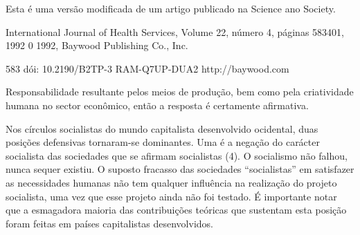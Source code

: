 \documentclass[twocolumn,amsmath,amssymb,aps,pre,floatfix]{revtex4-2}
\begin{document}
\par
Esta é uma versão modificada de um artigo publicado na Science ano Society.
\par
International Journal of Health Services, Volume 22, número 4, páginas 583401, 1992 0 1992, Baywood Publishing Co., Inc.
\par
583 dói: 10.2190/B2TP-3 RAM-Q7UP-DUA2 http://baywood.com
\par
Responsabilidade resultante pelos meios de produção, bem como pela criatividade humana no sector econômico, então a resposta é certamente afirmativa.
\par
Nos círculos socialistas do mundo capitalista desenvolvido ocidental, duas posições defensivas tornaram-se dominantes. Uma é a negação do carácter socialista das sociedades que se afirmam socialistas (4). O socialismo não falhou, nunca sequer existiu. O suposto fracasso das sociedades “socialistas” em satisfazer as necessidades humanas não tem qualquer influência na realização do projeto socialista, uma vez que esse projeto ainda não foi testado. É importante notar que a esmagadora maioria das contribuições teóricas que sustentam esta posição foram feitas em países capitalistas desenvolvidos.
\par
\end{document}
